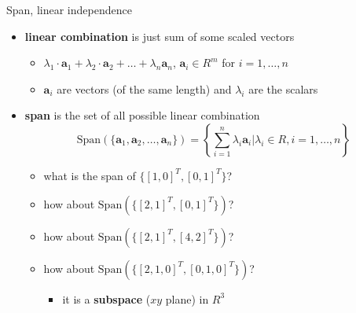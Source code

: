 \documentclass{scrartcl}
\def\tightlist{}
\newcommand{\vv}[1]{\boldsymbol{#1}}
\begin{document}
\begin{frame}{Span, linear independence}
\protect\hypertarget{span-linear-independence}{}

\begin{itemize}
\tightlist
\item
  \textbf{linear combination} is just sum of some scaled vectors

  \begin{itemize}
  \tightlist
  \item
    \(\lambda_1\cdot \vv{a}_1 + \lambda_2 \cdot \vv{a}_2+\ldots + \lambda_n\vv{a}_n\),
    \(\vv{a}_i \in R^m\) for \(i=1,\ldots,n\)
  \item
    \(\vv{a}_{i}\) are vectors (of the same length) and \(\lambda_i\)
    are the scalars
  \end{itemize}
\item
  \textbf{span} is the set of all possible linear combination
  \[\text{Span}( \{\vv{a}_{1}, \vv{a}_2, \ldots,\vv{a}_n\}) = \left\{\sum_{i=1}^n \lambda_i \vv{a}_i | \lambda_i \in R, i= 1,\ldots,n\right \}\]

  \begin{itemize}
  \tightlist
  \item
    what is the span of \(\{[1,0]^T, [0,1]^T\}\)?
  \item
    how about \(\text{Span}( \{[2,1]^T, [0,1]^T\})\)?
  \item
    how about \(\text{Span}( \{[2,1]^T, [4,2]^T\})\)?
  \item
    how about \(\text{Span}(\{[2,1,0]^T, [0,1,0]^T\})\)?

    \begin{itemize}
    \tightlist
    \item
      it is a \textbf{subspace} (\(xy\) plane) in \(R^3\)
    \end{itemize}
  \end{itemize}
\end{itemize}

\end{frame}
\end{document}
